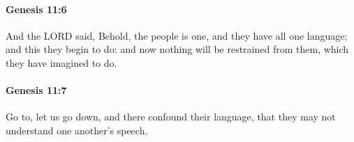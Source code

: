 		\paragraph{Genesis 11:6} %
			\label{GENESIS-11-6}

			And the LORD said, Behold, the people is one, and they have all one language; and this they begin to do: and now nothing will be restrained from them, which they have imagined to do.


		\paragraph{Genesis 11:7} %
			\label{GENESIS-11-7}

			Go to, let us go down, and there confound their language, that they may not understand one another's speech.



